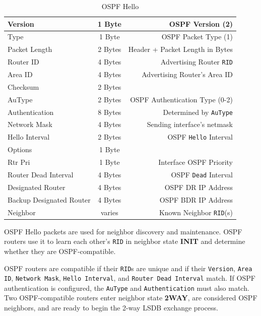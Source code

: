 \documentclass[12pt]{article}
\begin{document}
	\begin{table}[H]
	\centering
	\caption{OSPF Hello \label{tab:OSPF HELLO}}
	\begin{tabular}{| l | c | r |}\hline
	Version				& 1 Byte	& OSPF Version (2)\\\hline
	Type					& 1 Byte	& OSPF Packet Type (1)\\\hline
	Packet Length			& 2 Bytes	& Header + Packet Length in Bytes\\\hline
	Router ID				& 4 Bytes	& Advertising Router \texttt{RID}\\\hline
	Area ID				& 4 Bytes	& Advertising Router's Area ID\\\hline
	Checksum				& 2 Bytes	&\\\hline
	AuType				& 2 Bytes	& OSPF Authentication Type (0-2)\\\hline
	Authentication			& 8 Bytes	& Determined by \texttt{AuType}\\\hline
	Network Mask			& 4 Bytes	& Sending interface's netmask\\\hline
	Hello Interval			& 2 Bytes	& OSPF \texttt{Hello} Interval\\\hline
	Options				& 1 Byte	&\\\hline
	Rtr Pri				& 1 Byte	& Interface OSPF Priority\\\hline
	Router Dead Interval		& 4 Bytes	& OSPF \texttt{Dead} Interval\\\hline
	Designated Router		& 4 Bytes	& OSPF DR IP Address\\\hline
	Backup Designated Router	& 4 Bytes	& OSPF BDR IP Address\\\hline
	Neighbor				& varies	& Known Neighbor \texttt{RID}(s)\\\hline
	\end{tabular}\end{table}
	OSPF Hello packets are used for neighbor discovery and maintenance. OSPF routers use it to learn each other's \texttt{RID} in neighbor state \textbf{INIT} and determine whether they are OSPF-compatible.
	
	OSPF routers are compatible if their \texttt{RID}s are unique and if their \texttt{Version}, \texttt{Area ID}, \texttt{Network Mask}, \texttt{Hello Interval}, and \texttt{Router Dead Interval} match. If OSPF authentication is configured, the \texttt{AuType} and \texttt{Authentication} must also match. Two OSPF-compatible routers enter neighbor state \textbf{2WAY}, are considered OSPF neighbors, and are ready to begin the 2-way LSDB exchange process.
	
\end{document}
